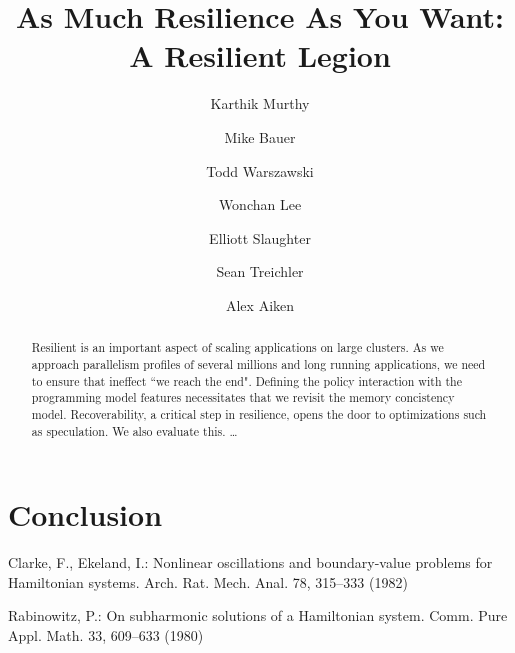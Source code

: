 \documentclass{llncs}
\begin{document}
\mainmatter              %
%
\title{As Much Resilience As You Want: \\A Resilient Legion}
%
 
\author{Karthik Murthy \and
Mike Bauer \and 
Todd Warszawski\and 
Wonchan Lee \and
Elliott Slaughter \and
Sean Treichler \and
Alex Aiken
}
%

\maketitle              %

\begin{abstract} 
Resilient is an important aspect of scaling applications on
large clusters. As we approach parallelism profiles of several millions and long running applications, we need to ensure that ineffect ``we reach the end".
Defining the policy interaction with the programming model features necessitates that we revisit the memory concistency model. 
Recoverability, a critical step in
resilience, opens the door to optimizations such as speculation. We also
evaluate this.  \dots
{}
\end{abstract}

%
















\section{Conclusion}

%
%

\begin{thebibliography}{5}
%
Clarke, F., Ekeland, I.:
Nonlinear oscillations and
boundary-value problems for Hamiltonian systems.
Arch. Rat. Mech. Anal. 78, 315--333 (1982)

Rabinowitz, P.:
On subharmonic solutions of a Hamiltonian system.
Comm. Pure Appl. Math. 33, 609--633 (1980)

\end{thebibliography}

\clearpage
%
\end{document}
